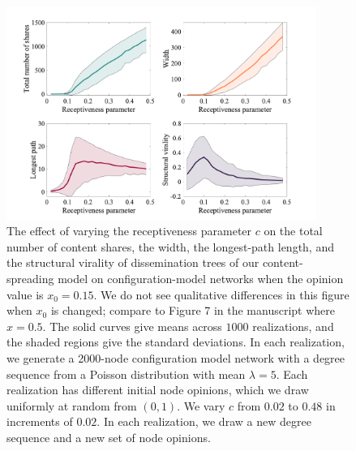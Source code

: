 \documentclass{amsart}
\begin{document}
\begin{figure}
    \centering
    \includegraphics[width=0.9\textwidth]{vary-c-compare-x15.png}
    \caption{The effect of varying the receptiveness parameter $c$ on the total number of content shares, the width, the longest-path length, and the structural virality of dissemination trees of our content-spreading model on configuration-model networks when the opinion value is $x_0=0.15$. We do not see qualitative differences in this figure when $x_0$ is changed; compare to Figure 7 in the manuscript where $x=0.5$.  
    The solid curves give means across $1000$ realizations, and the shaded regions give the standard deviations. In each realization, we generate a 2000-node configuration model network with a degree sequence from a Poisson distribution with mean $\lambda = 5$.
    Each realization has different initial node opinions, which we draw uniformly at random from $(0,1)$. 
    We vary $c$ from $0.02$ to $0.48$ in increments of $0.02$.
    In each realization, we draw a new degree sequence and a new set of node opinions.
    }
\end{figure}
\end{document}
